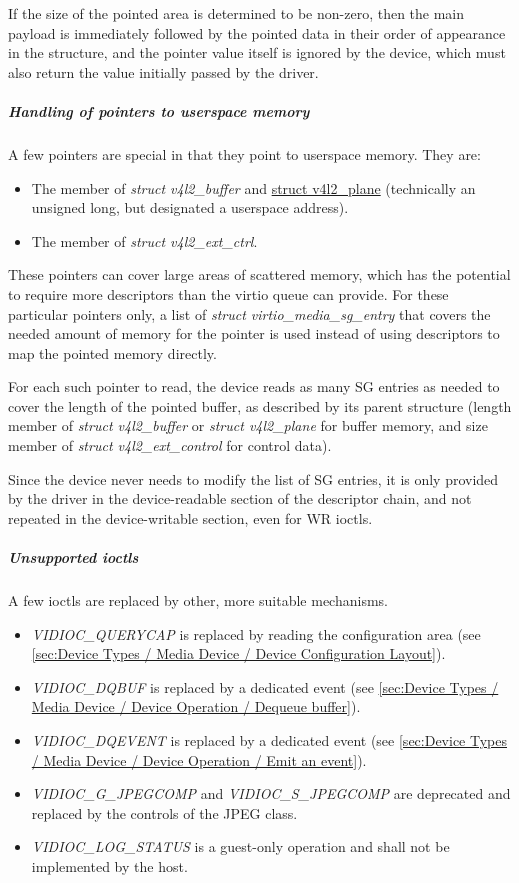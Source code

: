 If the size of the pointed area is determined to be non-zero, then the main
payload is immediately followed by the pointed data in their order of
appearance in the structure, and the pointer value itself is ignored by the
device, which must also return the value initially passed by the driver.

\subparagraph{Handling of pointers to userspace memory}

A few pointers are special in that they point to userspace memory. They are:

\begin{itemize}
\item The  member of \textit{struct v4l2_buffer} and
\href{https://www.kernel.org/doc/html/latest/userspace-api/media/v4l/buffer.html#struct-v4l2-plane}{struct v4l2_plane}
(technically an unsigned long, but designated a userspace address).
\item The  member of \textit{struct v4l2_ext_ctrl}.
\end{itemize}

These pointers can cover large areas of scattered memory, which has the
potential to require more descriptors than the virtio queue can provide. For
these particular pointers only, a list of \textit{struct virtio_media_sg_entry}
that covers the needed amount of memory for the pointer is used instead of
using descriptors to map the pointed memory directly.

For each such pointer to read, the device reads as many SG entries as needed
to cover the length of the pointed buffer, as described by its parent
structure (length member of \textit{struct v4l2_buffer} or
\textit{struct v4l2_plane} for buffer memory, and size member of
\textit{struct v4l2_ext_control} for control data).

Since the device never needs to modify the list of SG entries, it is only
provided by the driver in the device-readable section of the descriptor chain,
and not repeated in the device-writable section, even for WR ioctls.

\subparagraph{Unsupported ioctls}

A few ioctls are replaced by other, more suitable mechanisms.

\begin{itemize}
\item \textit{VIDIOC_QUERYCAP} is replaced by reading the configuration area
(see \ref{sec:Device Types / Media Device / Device Configuration Layout}).
\item \textit{VIDIOC_DQBUF} is replaced by a dedicated event
(see \ref{sec:Device Types / Media Device / Device Operation / Dequeue buffer}).
\item \textit{VIDIOC_DQEVENT} is replaced by a dedicated event
(see \ref{sec:Device Types / Media Device / Device Operation / Emit an event}).
\item \textit{VIDIOC_G_JPEGCOMP} and \textit{VIDIOC_S_JPEGCOMP} are deprecated
and replaced by the controls of the JPEG class.
\item \textit{VIDIOC_LOG_STATUS} is a guest-only operation and shall not be
implemented by the host.
\end{itemize}

